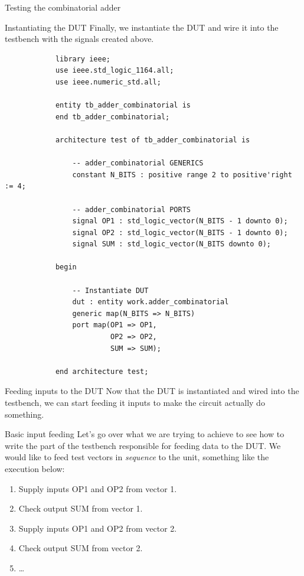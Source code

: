 \documentclass[a4paper, 12pt, onecolumn]{article}
\begin{document}
\begin{section}{Testing the combinatorial adder}
\begin{subsection}{Instantiating the DUT}
        Finally, we instantiate the DUT and wire it into the testbench with the signals created above.

        \begin{verbatim}
            library ieee;
            use ieee.std_logic_1164.all;
            use ieee.numeric_std.all;

            entity tb_adder_combinatorial is
            end tb_adder_combinatorial;

            architecture test of tb_adder_combinatorial is

                -- adder_combinatorial GENERICS
                constant N_BITS : positive range 2 to positive'right := 4;

                -- adder_combinatorial PORTS
                signal OP1 : std_logic_vector(N_BITS - 1 downto 0);
                signal OP2 : std_logic_vector(N_BITS - 1 downto 0);
                signal SUM : std_logic_vector(N_BITS downto 0);

            begin

                -- Instantiate DUT
                dut : entity work.adder_combinatorial
                generic map(N_BITS => N_BITS)
                port map(OP1 => OP1,
                         OP2 => OP2,
                         SUM => SUM);

            end architecture test;
        \end{verbatim}
        \vspace{-1em}
    \end{subsection}

    \clearpage

    \begin{subsection}{Feeding inputs to the DUT}
        Now that the DUT is instantiated and wired into the testbench, we can start feeding it inputs to make the circuit actually do something.

        \begin{subsubsection}{Basic input feeding}
            Let's go over what we are trying to achieve to see how to write the part of the testbench responsible for feeding data to the DUT. We would like to feed test vectors in \emph{sequence} to the unit, something like the execution below:

            \begin{enumerate}
                \item Supply inputs OP1 and OP2 from vector 1.
                \item Check output SUM from vector 1.
                \item Supply inputs OP1 and OP2 from vector 2.
                \item Check output SUM from vector 2.
                \item \ldots
            \end{enumerate}


\end{subsubsection}
\end{subsection}
\end{section}
\end{document}
